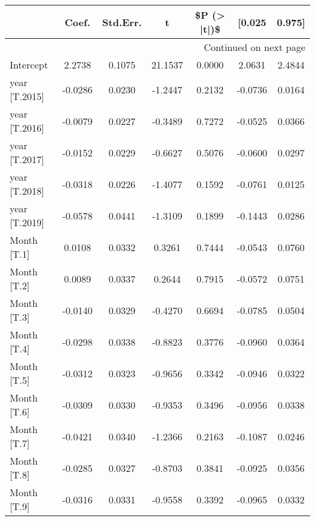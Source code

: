 \begin{longtable}{p{4cm}cccccc}
\toprule
{} &   Coef. &  Std.Err. &       t &  \$P (> |t|)\$ &  [0.025 &  0.975] \\
\midrule
\endhead
\midrule
\multicolumn{7}{r}{{Continued on next page}} \\
\midrule
\endfoot

\bottomrule
\endlastfoot
Intercept                                     &  2.2738 &    0.1075 & 21.1537 &       0.0000 &  2.0631 &  2.4844 \\
year [T.2015]                                 & -0.0286 &    0.0230 & -1.2447 &       0.2132 & -0.0736 &  0.0164 \\
year [T.2016]                                 & -0.0079 &    0.0227 & -0.3489 &       0.7272 & -0.0525 &  0.0366 \\
year [T.2017]                                 & -0.0152 &    0.0229 & -0.6627 &       0.5076 & -0.0600 &  0.0297 \\
year [T.2018]                                 & -0.0318 &    0.0226 & -1.4077 &       0.1592 & -0.0761 &  0.0125 \\
year [T.2019]                                 & -0.0578 &    0.0441 & -1.3109 &       0.1899 & -0.1443 &  0.0286 \\
Month [T.1]                                   &  0.0108 &    0.0332 &  0.3261 &       0.7444 & -0.0543 &  0.0760 \\
Month [T.2]                                   &  0.0089 &    0.0337 &  0.2644 &       0.7915 & -0.0572 &  0.0751 \\
Month [T.3]                                   & -0.0140 &    0.0329 & -0.4270 &       0.6694 & -0.0785 &  0.0504 \\
Month [T.4]                                   & -0.0298 &    0.0338 & -0.8823 &       0.3776 & -0.0960 &  0.0364 \\
Month [T.5]                                   & -0.0312 &    0.0323 & -0.9656 &       0.3342 & -0.0946 &  0.0322 \\
Month [T.6]                                   & -0.0309 &    0.0330 & -0.9353 &       0.3496 & -0.0956 &  0.0338 \\
Month [T.7]                                   & -0.0421 &    0.0340 & -1.2366 &       0.2163 & -0.1087 &  0.0246 \\
Month [T.8]                                   & -0.0285 &    0.0327 & -0.8703 &       0.3841 & -0.0925 &  0.0356 \\
Month [T.9]                                   & -0.0316 &    0.0331 & -0.9558 &       0.3392 & -0.0965 &  0.0332 \\

\end{longtable}
